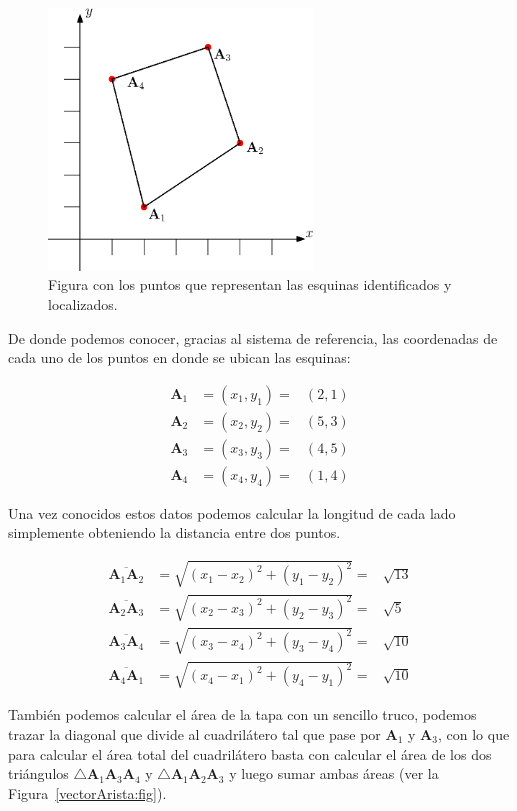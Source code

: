 \begin{figure}
 \centering
 \includegraphics[width=7cm]{img/01/cuadrilatero_diagrama}
 \caption[Cuadrilátero localizado en el espacio]{ 
 Figura con los puntos que representan las esquinas identificados y localizados.
 } \label{cuadrilateroDiagrama:fig}
\end{figure}

De donde podemos conocer, gracias al sistema de referencia, las coordenadas de cada uno de los puntos en donde se ubican las esquinas:

\begin{eqnarray}
\textbf{A}_1 & =  (x_1, y_1)  = & (2,1) \nonumber \\
\textbf{A}_2 & =  (x_2, y_2)  = & (5,3) \nonumber \\
\textbf{A}_3 & =  (x_3, y_3)  = & (4,5) \nonumber \\
\textbf{A}_4 & =  (x_4, y_4)  = & (1,4) \nonumber
\end{eqnarray}

Una vez conocidos estos datos podemos calcular la longitud de cada lado simplemente obteniendo la distancia entre dos puntos.

\begin{eqnarray}
\overline{\textbf{A}_1 \textbf{A}_2} & =  \sqrt{(x_1 - x_2)^2 + (y_1 - y_2)^2}  = & \sqrt{13}  \nonumber \\
\overline{\textbf{A}_2 \textbf{A}_3} & =  \sqrt{(x_2 - x_3)^2 + (y_2 - y_3)^2}  = & \sqrt{5}   \nonumber \\
\overline{\textbf{A}_3 \textbf{A}_4} & =  \sqrt{(x_3 - x_4)^2 + (y_3 - y_4)^2}  = & \sqrt{10}  \nonumber \\
\overline{\textbf{A}_4 \textbf{A}_1} & =  \sqrt{(x_4 - x_1)^2 + (y_4 - y_1)^2}  = & \sqrt{10}  \nonumber
\end{eqnarray}

También podemos calcular el área de la tapa con un sencillo truco, podemos trazar la diagonal que divide al cuadrilátero tal que pase por $\textbf{A}_1$ y $\textbf{A}_3$, con lo que para calcular el área total del cuadrilátero basta con calcular el área de los dos triángulos $\bigtriangleup \textbf{A}_1 \textbf{A}_3 \textbf{A}_4$ y $\bigtriangleup \textbf{A}_1 \textbf{A}_2 \textbf{A}_3$ y luego sumar ambas áreas (ver la Figura~\ref{vectorArista:fig}).

